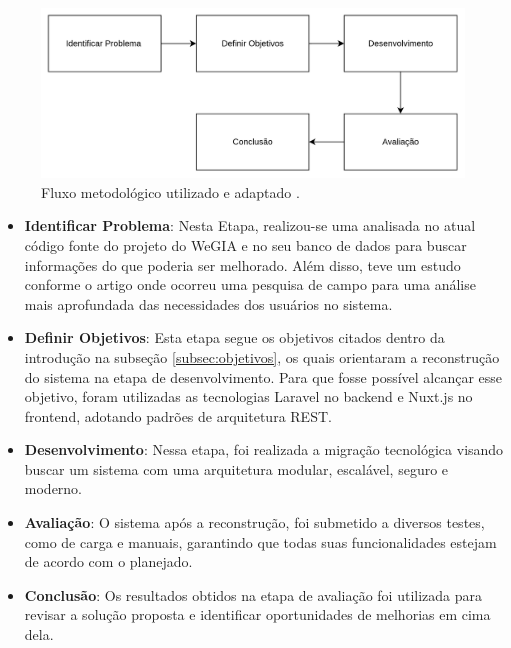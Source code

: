     \begin{figure}[H]
        \centering
        \includegraphics[width=1\linewidth]{imagens/Metodologia_utilizada.png}
        \caption{Fluxo metodológico utilizado e adaptado \citep{pimentel2020dsr} .}
        \label{fig:metodologia_utilizada}
    \end{figure}

     \begin{itemize}
        \item \textbf{Identificar Problema}:
            Nesta Etapa, realizou-se uma analisada no atual código fonte do projeto do WeGIA e no seu banco de dados para buscar informações do que poderia ser melhorado. Além disso, teve um estudo conforme o artigo \cite[]{latinoware2024wegia} onde ocorreu uma pesquisa de campo para uma análise mais aprofundada das necessidades dos usuários no sistema.
        \item \textbf{Definir Objetivos}:
            Esta etapa segue os objetivos citados dentro da introdução na subseção \ref{subsec:objetivos}, os quais orientaram a reconstrução do sistema na etapa de desenvolvimento. Para que fosse possível alcançar esse objetivo, foram utilizadas as tecnologias Laravel no backend e Nuxt.js no frontend, adotando padrões de arquitetura REST.
        \item \textbf{Desenvolvimento}:
            Nessa etapa, foi realizada a migração tecnológica visando buscar um sistema com uma arquitetura modular, escalável, seguro e moderno.
        \item \textbf{Avaliação}:
            O sistema após a reconstrução, foi submetido a diversos testes, como de carga e manuais, garantindo que todas suas funcionalidades estejam de acordo com o planejado.
        \item \textbf{Conclusão}:
            Os resultados obtidos na etapa de avaliação foi utilizada para revisar a solução proposta e identificar oportunidades de melhorias em cima dela.
    \end{itemize}

